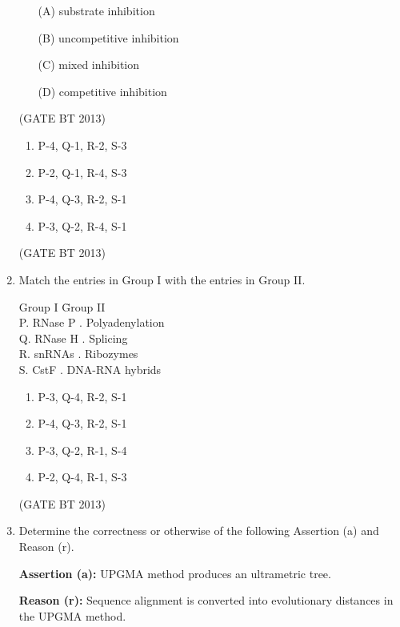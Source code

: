 \documentclass[journal,12pt,onecolumn]{IEEEtran}
\theoremstyle{remark}
\begin{document}
\begin{enumerate}
    \begin{enumerate}
        \item[(A)] substrate inhibition
        \item[(B)] uncompetitive inhibition
        \item[(C)] mixed inhibition
        \item[(D)] competitive inhibition
    \end{enumerate} \hfill(GATE BT 2013)


\begin{enumerate}[label=(\Alph*)]
    \item P-4, Q-1, R-2, S-3
    \item P-2, Q-1, R-4, S-3
    \item P-4, Q-3, R-2, S-1
    \item P-3, Q-2, R-4, S-1
\end{enumerate} \hfill(GATE BT 2013)

\item 

Match the entries in Group I with the entries in Group II.

\begin{tabbing}
Group I \hspace{3.5cm} \= Group II \\
P. RNase P . Polyadenylation \\
Q. RNase H . Splicing \\
R. snRNAs . Ribozymes \\
S. CstF . DNA-RNA hybrids \\
\end{tabbing}

\begin{enumerate}[label=(\Alph*)]
    \item P-3, Q-4, R-2, S-1
    \item P-4, Q-3, R-2, S-1
    \item P-3, Q-2, R-1, S-4
    \item P-2, Q-4, R-1, S-3
\end{enumerate} \hfill(GATE BT 2013)

\item 

Determine the correctness or otherwise of the following Assertion (a) and Reason (r).

\textbf{Assertion (a):} UPGMA method produces an ultrametric tree.

\textbf{Reason (r):} Sequence alignment is converted into evolutionary distances in the UPGMA method.


\end{enumerate}
\end{document}
